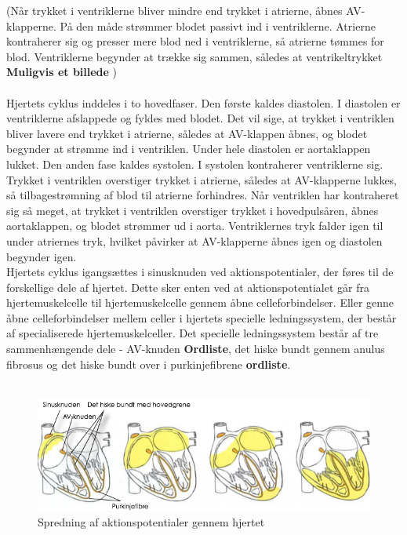 (Når trykket i ventriklerne bliver mindre end trykket i atrierne, åbnes AV-klapperne. På den måde strømmer blodet passivt ind i ventriklerne. Atrierne kontraherer sig og presser mere blod ned i ventriklerne, så atrierne tømmes for blod. Ventriklerne begynder at trække sig sammen, således at ventrikeltrykket \textbf{ Muligvis et billede} )\\ \\
Hjertets cyklus inddeles i to hovedfaser. Den første kaldes diastolen. I diastolen er ventriklerne afslappede og fyldes med blodet. Det vil sige, at trykket i ventriklen bliver lavere end trykket i atrierne, således at AV-klappen åbnes, og blodet begynder at strømme ind i ventriklen. Under hele diastolen er aortaklappen lukket. Den anden fase kaldes systolen. I systolen kontraherer ventriklerne sig. Trykket i ventriklen overstiger trykket i atrierne, således at AV-klapperne lukkes, så tilbagestrømning af blod til atrierne forhindres. Når ventriklen har kontraheret sig så meget, at trykket i ventriklen overstiger trykket i hovedpulsåren, åbnes aortaklappen, og blodet strømmer ud i aorta. Ventriklernes tryk falder igen til under atriernes tryk, hvilket påvirker at AV-klapperne åbnes igen og diastolen begynder igen.\\
Hjertets cyklus igangsættes i sinusknuden ved aktionspotentialer, der føres til de forskellige dele af hjertet. Dette sker enten ved at aktionspotentialet går fra hjertemuskelcelle til hjertemuskelcelle gennem åbne celleforbindelser. Eller genne åbne celleforbindelser mellem celler i hjertets specielle ledningssystem, der består af specialiserede hjertemuskelceller. Det specielle ledningssystem består af tre sammenhængende dele - AV-knuden \textbf{ Ordliste}, det hiske bundt gennem anulus fibrosus og det hiske bundt over i purkinjefibrene \textbf{ ordliste}. \\ \\

\begin{figure}[htb]

	\centering	
	\includegraphics[width=1\textwidth]{Figurer/Snip20150410_6}
	\caption{Spredning af aktionspotentialer gennem hjertet \protect\footnotemark}
\end{figure}







  